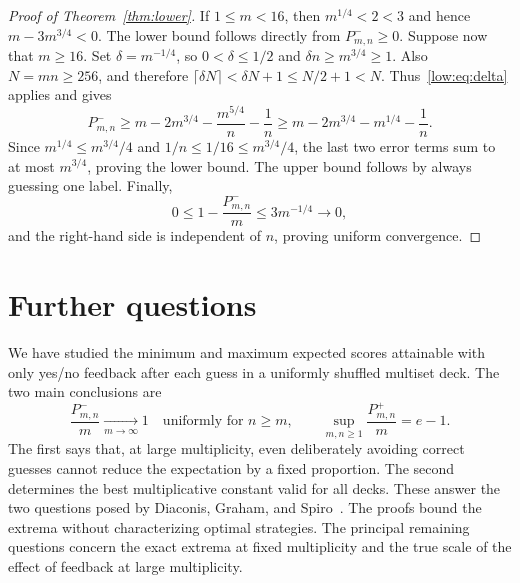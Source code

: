 \documentclass[11pt,reqno]{amsart}
\numberwithin{equation}{section}
\theoremstyle{remark}
\theoremstyle{definition}
\begin{document}
\begin{proof}[Proof of Theorem~\ref{thm:lower}]
If $1\le m<16$, then $m^{1/4}<2<3$ and hence $m-3m^{3/4}<0$. The lower bound follows directly from $P^-_{m,n}\ge0$. Suppose now that $m\ge16$. Set $\delta=m^{-1/4}$, so $0<\delta\le1/2$ and $\delta n\ge m^{3/4}\ge1$. Also $N=mn\ge256$, and therefore $\lceil\delta N\rceil<\delta N+1\le N/2+1<N$. Thus~\eqref{low:eq:delta} applies and gives
\[
 P^-_{m,n}\ge m-2m^{3/4}-\frac{m^{5/4}}n-\frac1n
 \ge m-2m^{3/4}-m^{1/4}-\frac1n.
\]
Since $m^{1/4}\le m^{3/4}/4$ and $1/n\le1/16\le m^{3/4}/4$, the last two error terms sum to at most $m^{3/4}$, proving the lower bound. The upper bound follows by always guessing one label. Finally,
\[
 0\le1-\frac{P^-_{m,n}}m\le3m^{-1/4}\longrightarrow0,
\]
and the right-hand side is independent of $n$, proving uniform convergence.
\end{proof}

\section{Further questions}
We have studied the minimum and maximum expected scores attainable with only yes/no feedback after each guess in a uniformly shuffled multiset deck. The two main conclusions are
\[
 \frac{P^-_{m,n}}{m}\xrightarrow[m\to\infty]{}1
 \quad\text{uniformly for $n\ge m$},
 \qquad
 \sup_{m,n\ge1}\frac{P^+_{m,n}}{m}=e-1.
\]
The first says that, at large multiplicity, even deliberately avoiding correct guesses cannot reduce the expectation by a fixed proportion. The second determines the best multiplicative constant valid for all decks. These answer the two questions posed by Diaconis, Graham, and Spiro~\cite[Conjectures~1 and~2]{DGS}. The proofs bound the extrema without characterizing optimal strategies. The principal remaining questions concern the exact extrema at fixed multiplicity and the true scale of the effect of feedback at large multiplicity.
\end{document}
